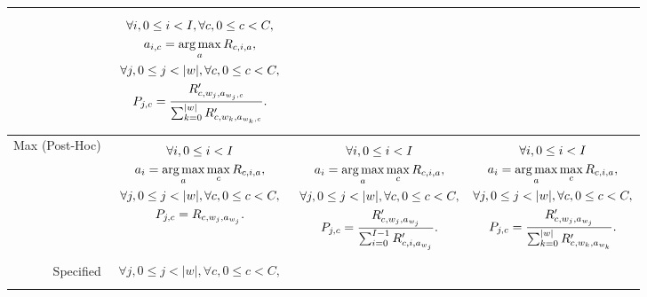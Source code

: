 \documentclass{article}
\def\argmax{\mathop{\rm arg\,max}}
\begin{document}
\begin{tabular}{r|p{1.7in}|p{1.7in}|p{1.7in}}
\begin{minipage}{1.7in}
\end{minipage}
& 
\begin{minipage}{1.7in}
\begin{gather*}
\forall i, 0 \le i < I, \forall c, 0 \le c < C,\\
a_{i,c} = \argmax_a R_{c,i,a}, \\
\forall j, 0 \le j < \vert w \vert, \forall c, 0 \le c < C,\\
P_{j,c} = \frac{R'_{c,w_j,a_{w_j,c}}}
{\sum_{k=0}^{\vert w \vert} R'_{c,w_k,a_{w_k,c}}}.
\end{gather*}
\end{minipage}
\\
\hline
Max (Post-Hoc) &
\begin{minipage}{1.7in}
\begin{gather*}
\forall i, 0 \le i < I \\
a_{i} = \argmax_a \max_c R_{c,i,a}, \\
\forall j, 0 \le j < \vert w \vert, \forall c, 0 \le c < C,\\
P_{j,c} = R_{c,w_j,a_{w_j}}.
\end{gather*}
\end{minipage}
&
\begin{minipage}{1.7in}
\begin{gather*}
\forall i, 0 \le i < I \\
a_{i} = \argmax_a \max_c R_{c,i,a}, \\
\forall j, 0 \le j < \vert w \vert, \forall c, 0 \le c < C,\\
P_{j,c} = \frac{R'_{c,w_j,a_{w_j}}}
{\sum_{i=0}^{I-1} R'_{c,i,a_{w_j}}}.
\end{gather*}
\end{minipage}
& 
\begin{minipage}{1.7in}
\begin{gather*}
\forall i, 0 \le i < I \\
a_{i} = \argmax_a \max_c R_{c,i,a}, \\
\forall j, 0 \le j < \vert w \vert, \forall c, 0 \le c < C,\\
P_{j,c} = \frac{R'_{c,w_j,a_{w_j}}}
{\sum_{k=0}^{\vert w \vert} R'_{c,w_k,a_{w_k}}}.
\end{gather*}
\end{minipage}
\\
\hline
Specified &
\begin{minipage}{1.7in}
\begin{gather*}
\forall j, 0 \le j < \vert w \vert, \forall c, 0 \le c < C,\\

\end{gather*}
\end{minipage}
\end{tabular}
\end{document}
